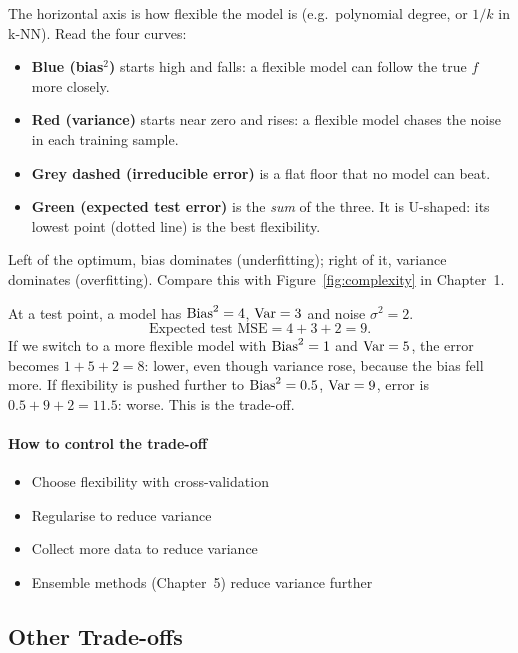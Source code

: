 \begin{explain}
The horizontal axis is how flexible the model is (e.g.\ polynomial degree, or $1/k$ in k-NN). Read the four curves:
\begin{itemize}
  \item \textbf{Blue (bias$^2$)} starts high and falls: a flexible model can follow the true $f$ more closely.
  \item \textbf{Red (variance)} starts near zero and rises: a flexible model chases the noise in each training sample.
  \item \textbf{Grey dashed (irreducible error)} is a flat floor that no model can beat.
  \item \textbf{Green (expected test error)} is the \emph{sum} of the three. It is U-shaped: its lowest point (dotted line) is the best flexibility.
\end{itemize}
Left of the optimum, bias dominates (underfitting); right of it, variance dominates (overfitting). Compare this with Figure~\ref{fig:complexity} in Chapter~1.
\end{explain}

\begin{example}
At a test point, a model has $\operatorname{Bias}^2=4$, $\operatorname{Var}=3$ and noise $\sigma^2=2$.
\[
  \text{Expected test MSE}=4+3+2=9 .
\]
If we switch to a more flexible model with $\operatorname{Bias}^2=1$ and $\operatorname{Var}=5$, the error becomes $1+5+2=8$: lower, even though variance rose, because the bias fell more. If flexibility is pushed further to $\operatorname{Bias}^2=0.5$, $\operatorname{Var}=9$, error is $0.5+9+2=11.5$: worse. This is the trade-off.
\end{example}


\paragraph{How to control the trade-off}
\begin{itemize}
  \item Choose flexibility with cross-validation
  \item Regularise to reduce variance
  \item Collect more data to reduce variance
  \item Ensemble methods (Chapter~5) reduce variance further
\end{itemize}

\subsection{Other Trade-offs}

